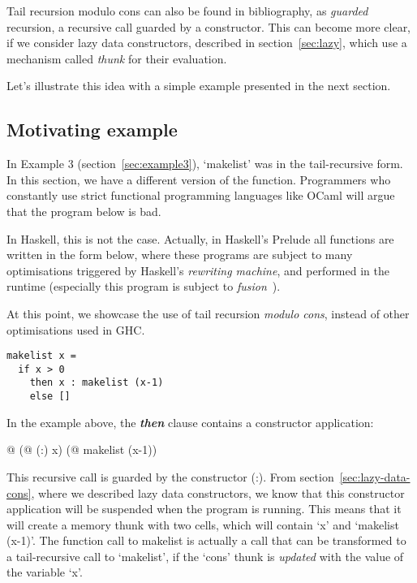 \documentclass[diploma]{softlab-thesis}
\begin{document}
Tail recursion modulo cons can also be found in bibliography, as \textit{guarded} recursion, 
a recursive call guarded by a constructor. This can become more clear, if we consider lazy data constructors, 
described in section~\ref{sec:lazy}, which use a mechanism called \textit{thunk} for their evaluation.

Let's illustrate this idea with a simple example presented in the next section.

\subsection {Motivating example}
In Example 3 (section~\ref{sec:example3}), `makelist' was in the tail-recursive 
form. In this section, we have a different version of the function. 
Programmers who constantly use strict functional programming languages like OCaml 
will argue that the program below is bad. 

In Haskell, this is not the case. Actually, in Haskell's Prelude all functions are written 
in the form below, where these programs are subject to many optimisations triggered 
by Haskell's \textit{rewriting machine}, and performed in the runtime 
(especially this program is subject to \textit{fusion}~\cite{Coutts07}). 
\newline
\par At this point, we showcase the use of tail recursion \textit{modulo cons}, instead of other optimisations
used in GHC.

\begin{verbatim}
makelist x = 
  if x > 0 
    then x : makelist (x-1)
    else []
\end{verbatim}

In the example above, the \textbf{\textit{then}} clause contains a constructor 
application: 
\begin{center}
  @ (@ (:) x) (@ makelist (x-1))
\end{center}

This recursive call is guarded by the constructor (:).
From section~\ref{sec:lazy-data-cons}, where we described lazy data constructors,
we know that this constructor application will be suspended when 
the program is running. This means that it will create a memory 
thunk with two cells, which will contain `x' and `makelist (x-1)'.
The function call to makelist is actually a call that can be transformed 
to a tail-recursive call to `makelist', if the `cons' thunk is \textit{updated} 
with the value of the variable `x'. 
\end{document}
